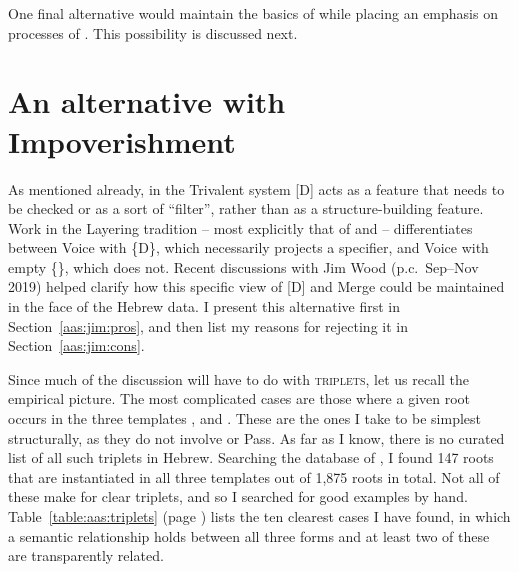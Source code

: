 \begin{exe}
\begin{xlist}
\begin{exe}
\begin{exe}
\begin{xlist}
\begin{exe}
\begin{exe}
\begin{exe}
\begin{exe}
\begin{exe}
\begin{xlist}
\begin{exe}
One final alternative would maintain the basics of  while placing an emphasis on processes of . This possibility is discussed next.

\section{An alternative with Impoverishment} \label{aas:jim}

\label{r1:g:2c2}As mentioned already, in the Trivalent system [D] acts as a feature that needs to be checked or as a sort of ``filter'', rather than as a structure-building feature. Work in the Layering tradition -- most explicitly that of \cite{schaefer08} and \cite{wood15springer} -- differentiates between Voice with \{D\}, which necessarily projects a specifier, and Voice with empty \{\}, which does not. Recent discussions with Jim Wood (p.c.~Sep--Nov 2019) helped clarify how this specific view of [D] and Merge could be maintained in the face of the Hebrew data. I present this alternative first in Section~\ref{aas:jim:pros}, and then list my reasons for rejecting it in Section~\ref{aas:jim:cons}.

Since much of the discussion will have to do with \textsc{triplets}, let us recall the empirical picture. The most complicated cases are those where a given root occurs in the three templates {\tkal}, {\tnif} and {\thif}. These are the ones I take to be simplest structurally, as they do not involve {\va} or Pass. As far as I know, there is no curated list of all such triplets in Hebrew. Searching the database of \cite{ehrenfeld12}, I found 147 roots that are instantiated in all three templates out of 1,875 roots in total. Not all of these make for clear triplets, and so I searched for good examples by hand. Table~\ref{table:aas:triplets} (page \pageref{table:aas:triplets}) lists the ten clearest cases I have found, in which a semantic relationship holds between all three forms and at least two of these are transparently related.


\end{exe}
\end{xlist}
\end{exe}
\end{exe}
\end{exe}
\end{exe}
\end{exe}
\end{xlist}
\end{exe}
\end{exe}
\end{xlist}
\end{exe}
